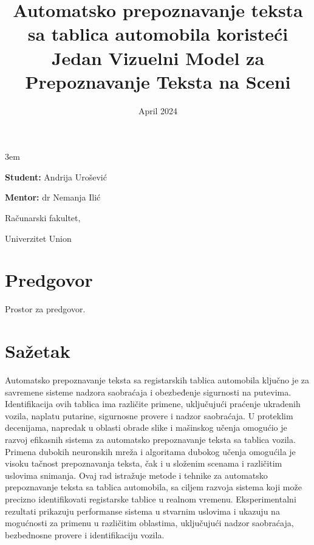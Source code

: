 \documentclass[a4paper,12pt]{article}
\title{Automatsko prepoznavanje teksta sa tablica automobila koristeći Jedan Vizuelni Model za Prepoznavanje Teksta na Sceni}
\date{}
\begin{document}
	\emergencystretch 3em
	\begin{titlepage}
		\centering
		{\huge\bfseries \maketitle}
		
		{\large
			\textbf{Student:}
			Andrija Urošević
			\par
			\bigskip
			\textbf{Mentor:}
			dr Nemanja Ilić
		}
	
		\vfill
		{\large Računarski fakultet,\par}
		{\large Univerzitet Union\par}
		\bigskip
		\date{April 2024}
	\end{titlepage}
	
	
	\section*{Predgovor}
	Prostor za predgovor.
	\newpage
	
	\tableofcontents
	\newpage
	
	
	\section*{Sažetak}
	\noindent
	Automatsko prepoznavanje teksta sa registarskih tablica automobila ključno je za savremene sisteme nadzora saobraćaja i obezbeđenje sigurnosti na putevima. Identifikacija ovih tablica ima različite primene, uključujući praćenje ukradenih vozila, naplatu putarine, sigurnosne provere i nadzor saobraćaja. U proteklim decenijama, napredak u oblasti obrade slike i mašinskog učenja omogućio je razvoj efikasnih sistema za automatsko prepoznavanje teksta sa tablica vozila. Primena dubokih neuronskih mreža i algoritama dubokog učenja omogućila je visoku tačnost prepoznavanja teksta, čak i u složenim scenama i različitim uslovima snimanja. Ovaj rad istražuje metode i tehnike za automatsko prepoznavanje teksta sa tablica automobila, sa ciljem razvoja sistema koji može precizno identifikovati registarske tablice u realnom vremenu. Eksperimentalni rezultati prikazuju performanse sistema u stvarnim uslovima i ukazuju na mogućnosti za primenu u različitim oblastima, uključujući nadzor saobraćaja, bezbednosne provere i identifikaciju vozila.
	\newpage
	
\end{document}
